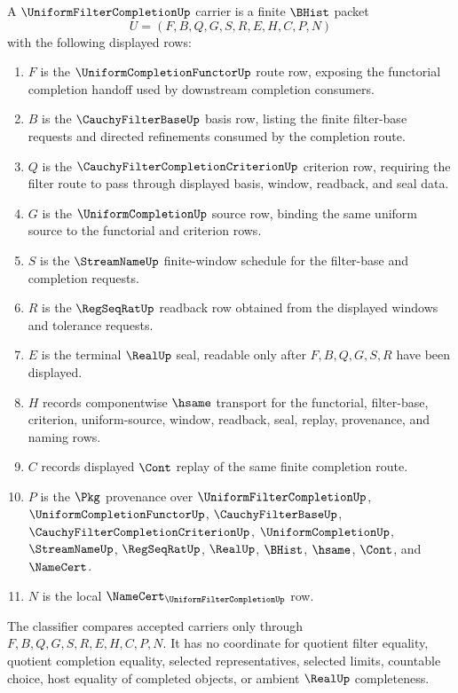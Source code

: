 \begin{definition}
\label{def:uniform-filter-completion-carrier}
A $\UniformFilterCompletionUp$ carrier is a finite $\BHist$ packet
$$
U=(F,B,Q,G,S,R,E,H,C,P,N)
$$
with the following displayed rows:
\begin{enumerate}
\item $F$ is the $\UniformCompletionFunctorUp$ route row, exposing the functorial completion handoff used by downstream completion consumers.
\item $B$ is the $\CauchyFilterBaseUp$ basis row, listing the finite filter-base requests and directed refinements consumed by the completion route.
\item $Q$ is the $\CauchyFilterCompletionCriterionUp$ criterion row, requiring the filter route to pass through displayed basis, window, readback, and seal data.
\item $G$ is the $\UniformCompletionUp$ source row, binding the same uniform source to the functorial and criterion rows.
\item $S$ is the $\StreamNameUp$ finite-window schedule for the filter-base and completion requests.
\item $R$ is the $\RegSeqRatUp$ readback row obtained from the displayed windows and tolerance requests.
\item $E$ is the terminal $\RealUp$ seal, readable only after $F,B,Q,G,S,R$ have been displayed.
\item $H$ records componentwise $\hsame$ transport for the functorial, filter-base, criterion, uniform-source, window, readback, seal, replay, provenance, and naming rows.
\item $C$ records displayed $\Cont$ replay of the same finite completion route.
\item $P$ is the $\Pkg$ provenance over $\UniformFilterCompletionUp$, $\UniformCompletionFunctorUp$, $\CauchyFilterBaseUp$, $\CauchyFilterCompletionCriterionUp$, $\UniformCompletionUp$, $\StreamNameUp$, $\RegSeqRatUp$, $\RealUp$, $\BHist$, $\hsame$, $\Cont$, and $\NameCert$.
\item $N$ is the local $\NameCert_{\UniformFilterCompletionUp}$ row.
\end{enumerate}
The classifier compares accepted carriers only through $F,B,Q,G,S,R,E,H,C,P,N$. It has no coordinate for quotient filter equality, quotient completion equality, selected representatives, selected limits, countable choice, host equality of completed objects, or ambient $\RealUp$ completeness.
\end{definition}

